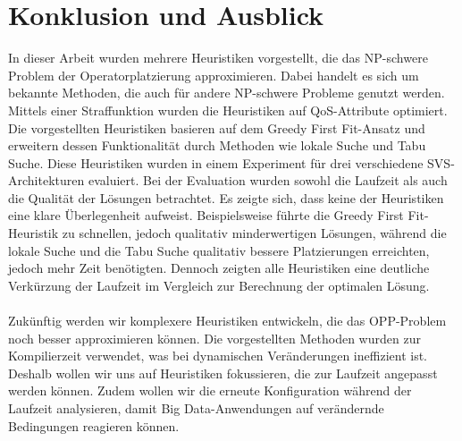 \documentclass{article}
\begin{document}
\section{Konklusion und Ausblick}In dieser Arbeit wurden mehrere Heuristiken vorgestellt, die das NP-schwere Problem der Operatorplatzierung approximieren.
Dabei handelt es sich um bekannte Methoden, die auch für andere NP-schwere Probleme genutzt werden. 
Mittels einer Straffunktion wurden die Heuristiken auf QoS-Attribute optimiert.\\
Die vorgestellten Heuristiken basieren auf dem Greedy First Fit-Ansatz und erweitern dessen Funktionalität durch Methoden wie lokale Suche und Tabu Suche. 
Diese Heuristiken wurden in einem Experiment für drei verschiedene SVS-Architekturen evaluiert. 
Bei der Evaluation wurden sowohl die Laufzeit als auch die Qualität der Lösungen betrachtet. 
Es zeigte sich, dass keine der Heuristiken eine klare Überlegenheit aufweist. 
Beispielsweise führte die Greedy First Fit-Heuristik zu schnellen, jedoch qualitativ minderwertigen Lösungen, 
während die lokale Suche und die Tabu Suche qualitativ bessere Platzierungen erreichten, jedoch mehr Zeit benötigten. 
Dennoch zeigten alle Heuristiken eine deutliche Verkürzung der Laufzeit im Vergleich zur Berechnung der optimalen Lösung.\\\\

Zukünftig werden wir komplexere Heuristiken entwickeln, die das OPP-Problem noch besser approximieren können. 
Die vorgestellten Methoden wurden zur Kompilierzeit verwendet, was bei dynamischen Veränderungen ineffizient ist. 
Deshalb wollen wir uns auf Heuristiken fokussieren, die zur Laufzeit angepasst werden können.
Zudem wollen wir die erneute Konfiguration während der Laufzeit analysieren, damit Big Data-Anwendungen auf verändernde Bedingungen reagieren können.

\newpage

\end{document}
